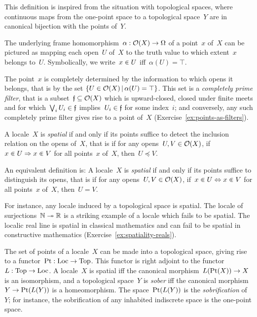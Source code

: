 \documentclass{ws-rv9x6}
\begin{document}
{This definition is inspired from the situation with topological spaces, where
continuous maps from the one-point space to a topological space~$Y$ are in
canonical bijection with the points of~$Y$.

The underlying frame homomorphism~$\alpha : \mathcal{O}(X) \to \Omega$ of a point~$x$
of~$X$ can be pictured as mapping each open~$U$ of~$X$ to the truth value to which
extent~$x$ belongs to~$U$. Symbolically, we write~$x \inplus U$ iff~$\alpha(U)
= \top$.

The point~$x$ is completely determined by the information to which opens it
belongs, that is by the set {$\{ U \in \mathcal{O}(X) \,|\, \alpha(U) = \top \}$}. This set is a \emph{completely
prime filter}, that is a subset~$\mathfrak{f} \subseteq \mathcal{O}(X)$ which is upward-closed,
closed under finite meets and for which~$\bigvee_i U_i \in \mathfrak{f}$ implies~$U_i
\in \mathfrak{f}$ for some index~$i$; and conversely, any such completely prime filter
gives rise to a point of~$X$ (Exercise~\ref{ex:points-as-filters}).

\begin{definition}A locale~$X$ is \emph{spatial} if and only if its points
suffice to detect the inclusion relation on the opens of~$X$, that is if for any opens~$U, V \in \mathcal{O}(X)$,
if~$x \inplus U \Rightarrow x \inplus V$ for all points~$x$ of~$X$, then~$U
\preceq V$.\end{definition}

An equivalent definition is: A locale~$X$ is \emph{spatial} if and only if its points
suffice to distinguish its opens, that is if for any opens~$U, V \in \mathcal{O}(X)$, if~$x \inplus U
\Leftrightarrow x \inplus V$ for all points~$x$ of~$X$, then~$U = V$.

For instance, any locale induced by a topological space is spatial. The locale
of surjections~$\mathbb{N} \twoheadrightarrow \mathbb{R}$ is a striking example of a locale which fails to be
spatial. The localic real line is spatial in classical mathematics and can
fail to be spatial in constructive mathematics (Exercise~\ref{ex:spatiality-reals}).

\begin{remark}\label{rem:definition-sober}
The set of points of a locale~$X$ can be made into a topological space, giving
rise to a functor~$\mathrm{Pt} : \mathrm{Loc} \to \mathrm{Top}$. This functor is right adjoint
to the functor~$L : \mathrm{Top} \to \mathrm{Loc}$. A locale~$X$ is spatial iff the canonical
morphism~$L(\mathrm{Pt}(X)) \to X$ is an isomorphism, and a topological space~$Y$
is \emph{sober} iff the canonical morphism~$Y \to \mathrm{Pt}(L(Y))$ is a
homeomorphism. The space~$\mathrm{Pt}(L(Y))$ is the \emph{sobrification} of~$Y$; for
instance, the sobrification of any inhabited indiscrete space is the one-point
space.


\end{remark}}
\end{document}
